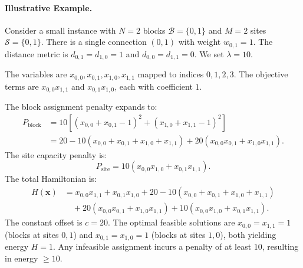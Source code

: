 \documentclass[12pt]{article}
\begin{document}
\paragraph{Illustrative Example.}
Consider a small instance with $N=2$ blocks $\mathcal{B}=\{0,1\}$ and $M=2$ sites $\mathcal{S}=\{0,1\}$. There is a single connection $(0,1)$ with weight $w_{0,1}=1$. The distance metric is $d_{0,1}=d_{1,0}=1$ and $d_{0,0}=d_{1,1}=0$. We set $\lambda=10$.

The variables are $x_{0,0}, x_{0,1}, x_{1,0}, x_{1,1}$ mapped to indices $0,1,2,3$. The objective terms are $x_{0,0}x_{1,1}$ and $x_{0,1}x_{1,0}$, each with coefficient $1$.

The block assignment penalty expands to:
\begin{align}
    P_{\text{block}} &= 10 \left[ (x_{0,0}+x_{0,1}-1)^2 + (x_{1,0}+x_{1,1}-1)^2 \right] \\
    &= 20 - 10(x_{0,0}+x_{0,1}+x_{1,0}+x_{1,1}) + 20(x_{0,0}x_{0,1} + x_{1,0}x_{1,1}).
\end{align}
The site capacity penalty is:
\begin{equation}
    P_{\text{site}} = 10(x_{0,0}x_{1,0} + x_{0,1}x_{1,1}).
\end{equation}
The total Hamiltonian is:
\begin{align}
    H(\mathbf{x}) &= x_{0,0}x_{1,1} + x_{0,1}x_{1,0} + 20 - 10(x_{0,0}+x_{0,1}+x_{1,0}+x_{1,1}) \\
    &\quad + 20(x_{0,0}x_{0,1} + x_{1,0}x_{1,1}) + 10(x_{0,0}x_{1,0} + x_{0,1}x_{1,1}).
\end{align}
The constant offset is $c=20$. The optimal feasible solutions are $x_{0,0}=x_{1,1}=1$ (blocks at sites $0,1$) and $x_{0,1}=x_{1,0}=1$ (blocks at sites $1,0$), both yielding energy $H=1$. Any infeasible assignment incurs a penalty of at least $10$, resulting in energy $\ge 10$.
\end{document}
